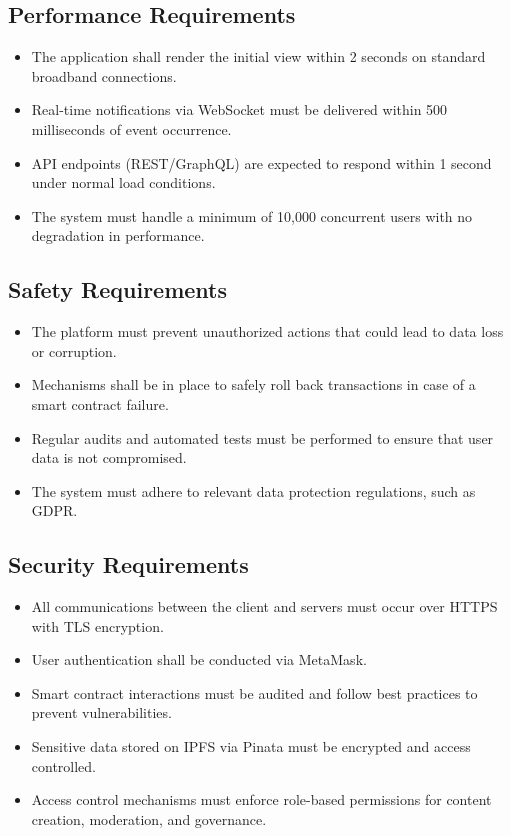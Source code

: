 \documentclass[a4paper,12pt]{article}
\begin{document}
\subsection{Performance Requirements}
\begin{itemize}
    \item The application shall render the initial view within 2 seconds on standard broadband connections.
    \item Real-time notifications via WebSocket must be delivered within 500 milliseconds of event occurrence.
    \item API endpoints (REST/GraphQL) are expected to respond within 1 second under normal load conditions.
    \item The system must handle a minimum of 10,000 concurrent users with no degradation in performance.
\end{itemize}

\subsection{Safety Requirements}
\begin{itemize}
    \item The platform must prevent unauthorized actions that could lead to data loss or corruption.
    \item Mechanisms shall be in place to safely roll back transactions in case of a smart contract failure.
    \item Regular audits and automated tests must be performed to ensure that user data is not compromised.
    \item The system must adhere to relevant data protection regulations, such as GDPR.
\end{itemize}

\subsection{Security Requirements}
\begin{itemize}
    \item All communications between the client and servers must occur over HTTPS with TLS encryption.
    \item User authentication shall be conducted via MetaMask. 
    \item Smart contract interactions must be audited and follow best practices to prevent vulnerabilities.
    \item Sensitive data stored on IPFS via Pinata must be encrypted and access controlled.
    \item Access control mechanisms must enforce role-based permissions for content creation, moderation, and governance.
\end{itemize}
\end{document}
